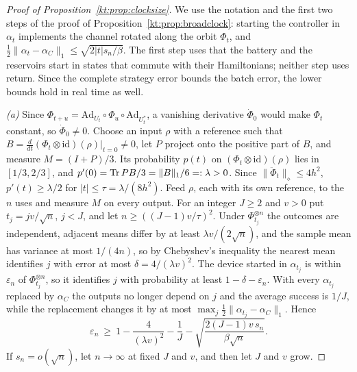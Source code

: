 \begin{proof}[Proof of Proposition~\ref{kt:prop:clocksize}]
We use the notation and the first two steps of the proof of Proposition~\ref{kt:prop:broadclock}: starting the controller in $\alpha_t$ implements the channel rotated along the orbit $\Phi_t$, and $\tfrac12\|\alpha_t-\alpha_C\|_1\le\sqrt{2|t|s_n/\beta}$. The first step uses that the battery and the reservoirs start in states that commute with their Hamiltonians; neither step uses return. Since the complete strategy error bounds the batch error, the lower bounds hold in real time as well.

\emph{(a)} Since $\Phi_{t+u}=\mathrm{Ad}_{U_t}\circ\Phi_u\circ\mathrm{Ad}_{U_t^*}$, a vanishing derivative $\dot\Phi_0$ would make $\Phi_t$ constant, so $\dot\Phi_0\ne0$. Choose an input $\rho$ with a reference such that $B=\frac{d}{dt}(\Phi_t\otimes\mathrm{id})(\rho)|_{t=0}\neq0$, let $P$ project onto the positive part of $B$, and measure $M=(I+P)/3$. Its probability $p(t)$ on $(\Phi_t\otimes\mathrm{id})(\rho)$ lies in $[1/3,2/3]$, and $p'(0)=\operatorname{Tr} PB/3=\|B\|_1/6=:\lambda>0$. Since $\|\ddot\Phi_t\|_\diamond\le4h^2$, $p'(t)\ge\lambda/2$ for $|t|\le\tau=\lambda/(8h^2)$. Feed $\rho$, each with its own reference, to the $n$ uses and measure $M$ on every output. For an integer $J\ge2$ and $v>0$ put $t_j=jv/\sqrt n$, $j<J$, and let $n\ge((J-1)v/\tau)^2$. Under $\Phi_{t_j}^{\otimes n}$ the outcomes are independent, adjacent means differ by at least $\lambda v/(2\sqrt n)$, and the sample mean has variance at most $1/(4n)$, so by Chebyshev's inequality the nearest mean identifies $j$ with error at most $\delta=4/(\lambda v)^2$. The device started in $\alpha_{t_j}$ is within $\varepsilon_n$ of $\Phi_{t_j}^{\otimes n}$, so it identifies $j$ with probability at least $1-\delta-\varepsilon_n$. With every $\alpha_{t_j}$ replaced by $\alpha_C$ the outputs no longer depend on $j$ and the average success is $1/J$, while the replacement changes it by at most $\max_j\frac12\|\alpha_{t_j}-\alpha_C\|_1$. Hence
\[
\varepsilon_n\ \ge\ 1-\frac4{(\lambda v)^2}-\frac1J-\sqrt{\frac{2(J-1)v\,s_n}{\beta\sqrt n}}.
\]
If $s_n=o(\sqrt n)$, let $n\to\infty$ at fixed $J$ and $v$, and then let $J$ and $v$ grow.


\end{proof}
